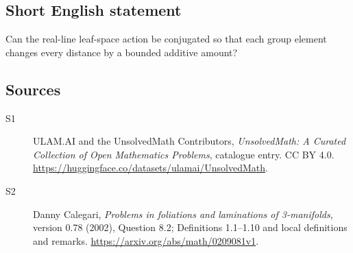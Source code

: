 \documentclass[11pt]{article}
\begin{document}
\subsection{Short English statement}
Can the real-line leaf-space action be conjugated so that each group element changes every distance by a bounded additive amount?
\subsection{Sources}
\begin{description}
\item[\hypertarget{source:statement:1}{S1}] ULAM.AI and the UnsolvedMath Contributors, \emph{UnsolvedMath: A Curated Collection of Open Mathematics Problems}, catalogue entry. CC BY 4.0. \url{https://huggingface.co/datasets/ulamai/UnsolvedMath}.
\item[\hypertarget{source:statement:2}{S2}] Danny Calegari, \emph{Problems in foliations and laminations of 3-manifolds}, version 0.78 (2002), Question 8.2; Definitions 1.1--1.10 and local definitions and remarks. \url{https://arxiv.org/abs/math/0209081v1}.
\end{description}
\label{end:statement}
\end{document}
